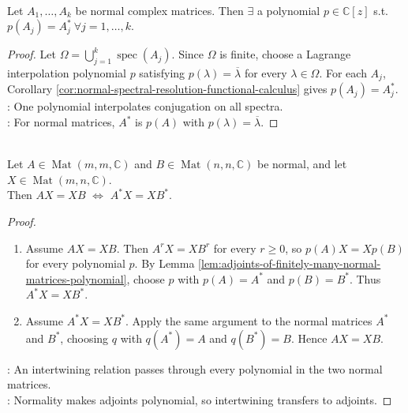 \begin{lemma} \label{lem:adjoints-of-finitely-many-normal-matrices-polynomial} \\
Let $A_1,\ldots,A_k$ be normal complex matrices. Then $\exists$ a polynomial $p\in\mathbb{C}[z]$ s.t. $p(A_j)=A_j^* \ \forall j=1,\ldots,k$.
\begin{proof}
Let $\Omega=\bigcup\limits_{j=1}^{k}\operatorname{spec}(A_j)$. Since $\Omega$ is finite, choose a Lagrange interpolation polynomial $p$ satisfying $p(\lambda)=\overline{\lambda}$ for every $\lambda\in\Omega$. For each $A_j$, Corollary \ref{cor:normal-spectral-resolution-functional-calculus} gives $p(A_j)=A_j^*$.\\
: One polynomial interpolates conjugation on all spectra.\\
: For normal matrices, $A^*$ is $p(A)$ with $p(\lambda)=\overline{\lambda}$.
\end{proof}
\end{lemma}

\begin{theorem} \label{thm:fuglede-putnam-normal-intertwining} \\
Let $A\in\operatorname{Mat}(m,m,\mathbb{C})$ and $B\in\operatorname{Mat}(n,n,\mathbb{C})$ be normal, and let $X\in\operatorname{Mat}(m,n,\mathbb{C})$.\\
Then $AX=XB$ $\Longleftrightarrow$ $A^*X=XB^*$.
\begin{proof}
\begin{enumerate}[label=\roman*.]
\setlength{\itemsep}{0pt}
\item[$(\Rightarrow)$] Assume $AX=XB$. Then $A^rX=XB^r$ for every $r\geq0$, so $p(A)X=Xp(B)$ for every polynomial $p$. By Lemma \ref{lem:adjoints-of-finitely-many-normal-matrices-polynomial}, choose $p$ with $p(A)=A^*$ and $p(B)=B^*$. Thus $A^*X=XB^*$.
\item[$(\Leftarrow)$] Assume $A^*X=XB^*$. Apply the same argument to the normal matrices $A^*$ and $B^*$, choosing $q$ with $q(A^*)=A$ and $q(B^*)=B$. Hence $AX=XB$.
\end{enumerate}
: An intertwining relation passes through every polynomial in the two normal matrices.\\
: Normality makes adjoints polynomial, so intertwining transfers to adjoints.
\end{proof}
\end{theorem}

